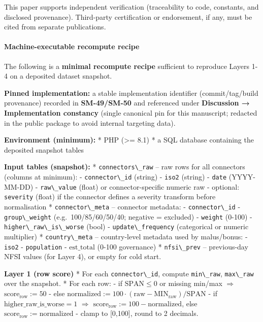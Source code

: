 \documentclass[
  11pt,
  peerreview,journal,onecolumn]{IEEEtran}
\newcommand{\passthrough}[1]{#1}
\begin{document}
This paper supports independent verification (traceability to code,
constants, and disclosed provenance). Third-party certification or
endorsement, if any, must be cited from separate publications.

\hypertarget{machine-executable-recompute-recipe}{%
\paragraph{Machine-executable recompute
recipe}\label{machine-executable-recompute-recipe}}

The following is a \textbf{minimal recompute recipe} sufficient to
reproduce Layers 1-4 on a deposited dataset snapshot.

\textbf{Pinned implementation:} a stable implementation identifier
(commit/tag/build provenance) recorded in \textbf{SM-49/SM-50} and
referenced under \textbf{Discussion → Implementation constancy} (single
canonical pin for this manuscript; redacted in the public package to
avoid internal targeting data).

\textbf{Environment (minimum):} * PHP (\textgreater= 8.1) * a SQL
database containing the deposited snapshot tables

\textbf{Input tables (snapshot):} *
\passthrough{\lstinline!connectors\_raw!} -- raw rows for all connectors
(columns at minimum): - \passthrough{\lstinline!connector\_id!} (string)
- \passthrough{\lstinline!iso2!} (string) -
\passthrough{\lstinline!date!} (YYYY-MM-DD) -
\passthrough{\lstinline!raw\_value!} (float) or connector-specific
numeric raw - optional: \passthrough{\lstinline!severity!} (float) if
the connector defines a severity transform before normalisation *
\passthrough{\lstinline!connector\_meta!} -- connector metadata: -
\passthrough{\lstinline!connector\_id!} -
\passthrough{\lstinline!group\_weight!} (e.g.~100/85/60/50/40; negative
= excluded) - \passthrough{\lstinline!weight!} (0-100) -
\passthrough{\lstinline!higher\_raw\_is\_worse!} (bool) -
\passthrough{\lstinline!update\_frequency!} (categorical or numeric
multiplier) * \passthrough{\lstinline!country\_meta!} -- country-level
metadata used by malus/bonus: - \passthrough{\lstinline!iso2!} -
\passthrough{\lstinline!population!} - \(\mathrm{est\_total}\) (0-100
governance) * \passthrough{\lstinline!nfsi\_prev!} -- previous-day NFSI
values (for Layer 4), or empty for cold start.

\textbf{Layer 1 (row score)} * For each
\passthrough{\lstinline!connector\_id!}, compute
\passthrough{\lstinline!min\_raw!}, \passthrough{\lstinline!max\_raw!}
over the snapshot. * For each row: - if \(\mathrm{SPAN}\le 0\) or
missing min/max \(\Rightarrow\) \(\mathrm{score}_{\mathrm{row}} := 50\)
- else
\(\mathrm{normalized}:=100\cdot(\mathrm{raw}-\mathrm{MIN}_{\mathrm{raw}})/\mathrm{SPAN}\)
- if \(\mathrm{higher\_raw\_is\_worse}=1\) \(\Rightarrow\)
\(\mathrm{score}_{\mathrm{row}} := 100-\mathrm{normalized}\), else
\(\mathrm{score}_{\mathrm{row}} := \mathrm{normalized}\) - clamp to
{[}0,100{]}, round to 2 decimals.
\end{document}
